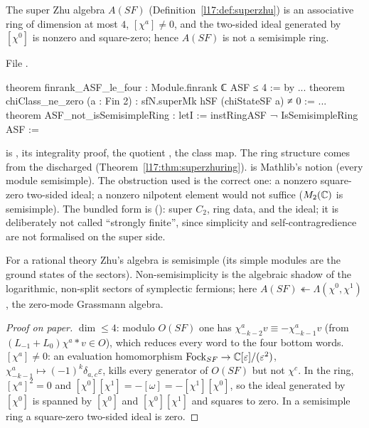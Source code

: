 \begin{theorem}\label{l17:thm:sfzhu}
The super Zhu algebra $A(SF)$ (Definition~\ref{l17:def:superzhu}) is an associative ring of dimension
at most $4$, $[\chi^a]\neq0$, and the two-sided ideal generated by $[\chi^0]$ is nonzero and
square-zero; hence $A(SF)$ is not a semisimple ring.
\end{theorem}
\noindent File .
\begin{leancode}
theorem finrank_ASF_le_four : Module.finrank ℂ ASF ≤ 4 := by
...
theorem chiClass_ne_zero (a : Fin 2) : sfN.superMk hSF (chiStateSF a) ≠ 0 :=
...
theorem ASF_not_isSemisimpleRing :
    letI := instRingASF
    ¬ IsSemisimpleRing ASF :=
\end{leancode}
\begin{dictionary}
 is ,  its integrality proof,  the
quotient ,  the class map. The ring structure 
comes from the discharged  (Theorem~\ref{l17:thm:superzhuring}).
 is Mathlib's notion (every module semisimple). The obstruction used is the
correct one: a nonzero square-zero two-sided ideal; a nonzero nilpotent element would not suffice
($M_2({\mathbb{C}})$ is semisimple). The bundled form is 
(): super $C_2$, ring data, and the ideal; it is
deliberately not called ``strongly finite'', since simplicity and self-contragredience are not
formalised on the super side.
\end{dictionary}
\begin{physics}
For a rational theory Zhu's algebra is semisimple (its simple modules are the ground states of the
sectors). Non-semisimplicity is the algebraic shadow of the logarithmic, non-split sectors of
symplectic fermions; here $A(SF)\twoheadleftarrow\Lambda(\chi^0,\chi^1)$, the zero-mode Grassmann
algebra.
\end{physics}
\begin{proof}[Proof on paper]
$\dim\le4$: modulo $O(SF)$ one has $\chi^a_{-k-2}v\equiv-\chi^a_{-k-1}v$ (from $(L_{-1}+L_0)\chi^a\ast v\in O$),
which reduces every word to the four bottom words. $[\chi^a]\neq0$: an evaluation homomorphism
$\mathrm{Fock}_{SF}\to{\mathbb{C}}[\varepsilon]/(\varepsilon^2)$, $\chi^a_{-k-1}\mapsto(-1)^k\delta_{a,c}\varepsilon$,
kills every generator of $O(SF)$ but not $\chi^c$. In the ring, $[\chi^a]^2=0$ and
$[\chi^0][\chi^1]=-[\omega]=-[\chi^1][\chi^0]$, so the ideal generated by $[\chi^0]$ is spanned by
$[\chi^0]$ and $[\chi^0][\chi^1]$ and squares to zero. In a semisimple ring a square-zero two-sided
ideal is zero.
\end{proof}
